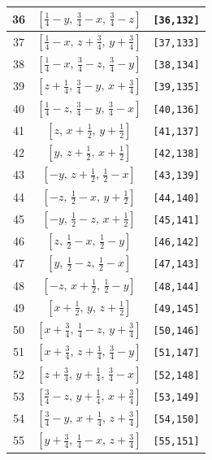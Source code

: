 \documentclass[fleqn,8pt]{jsarticle}
\begin{document}
\begin{longtable}{ccc}
36 & $\left[ \frac{1}{4} - y,\, \frac{3}{4} - x,\, \frac{3}{4} - z \right]$ & {\tt [36,132]} \\ \hline
37 & $\left[ \frac{1}{4} - x,\, z + \frac{3}{4},\, y + \frac{3}{4} \right]$ & {\tt [37,133]} \\ \hline
38 & $\left[ \frac{1}{4} - x,\, \frac{3}{4} - z,\, \frac{3}{4} - y \right]$ & {\tt [38,134]} \\ \hline
39 & $\left[ z + \frac{1}{4},\, \frac{3}{4} - y,\, x + \frac{3}{4} \right]$ & {\tt [39,135]} \\ \hline
40 & $\left[ \frac{1}{4} - z,\, \frac{3}{4} - y,\, \frac{3}{4} - x \right]$ & {\tt [40,136]} \\ \hline
41 & $\left[ z,\, x + \frac{1}{2},\, y + \frac{1}{2} \right]$ & {\tt [41,137]} \\ \hline
42 & $\left[ y,\, z + \frac{1}{2},\, x + \frac{1}{2} \right]$ & {\tt [42,138]} \\ \hline
43 & $\left[ - y,\, z + \frac{1}{2},\, \frac{1}{2} - x \right]$ & {\tt [43,139]} \\ \hline
44 & $\left[ - z,\, \frac{1}{2} - x,\, y + \frac{1}{2} \right]$ & {\tt [44,140]} \\ \hline
45 & $\left[ - y,\, \frac{1}{2} - z,\, x + \frac{1}{2} \right]$ & {\tt [45,141]} \\ \hline
46 & $\left[ z,\, \frac{1}{2} - x,\, \frac{1}{2} - y \right]$ & {\tt [46,142]} \\ \hline
47 & $\left[ y,\, \frac{1}{2} - z,\, \frac{1}{2} - x \right]$ & {\tt [47,143]} \\ \hline
48 & $\left[ - z,\, x + \frac{1}{2},\, \frac{1}{2} - y \right]$ & {\tt [48,144]} \\ \hline
49 & $\left[ x + \frac{1}{2},\, y,\, z + \frac{1}{2} \right]$ & {\tt [49,145]} \\ \hline
50 & $\left[ x + \frac{3}{4},\, \frac{1}{4} - z,\, y + \frac{3}{4} \right]$ & {\tt [50,146]} \\ \hline
51 & $\left[ x + \frac{3}{4},\, z + \frac{1}{4},\, \frac{3}{4} - y \right]$ & {\tt [51,147]} \\ \hline
52 & $\left[ z + \frac{3}{4},\, y + \frac{1}{4},\, \frac{3}{4} - x \right]$ & {\tt [52,148]} \\ \hline
53 & $\left[ \frac{3}{4} - z,\, y + \frac{1}{4},\, x + \frac{3}{4} \right]$ & {\tt [53,149]} \\ \hline
54 & $\left[ \frac{3}{4} - y,\, x + \frac{1}{4},\, z + \frac{3}{4} \right]$ & {\tt [54,150]} \\ \hline
55 & $\left[ y + \frac{3}{4},\, \frac{1}{4} - x,\, z + \frac{3}{4} \right]$ & {\tt [55,151]} \\ \hline

\end{longtable}
\end{document}
